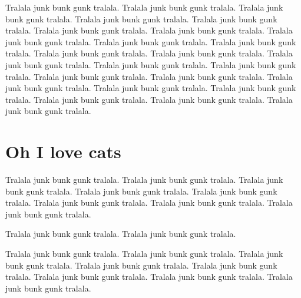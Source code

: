 \documentclass{book}
\begin{document}
Tralala junk bunk gunk tralala. Tralala junk bunk gunk tralala. Tralala junk bunk gunk tralala. Tralala junk bunk gunk tralala. Tralala junk bunk gunk tralala. Tralala junk bunk gunk tralala. Tralala junk bunk gunk tralala. Tralala junk bunk gunk tralala. Tralala junk bunk gunk tralala. Tralala junk bunk gunk tralala. Tralala junk bunk gunk tralala. Tralala junk bunk gunk tralala. Tralala junk bunk gunk tralala. Tralala junk bunk gunk tralala. Tralala junk bunk gunk tralala. Tralala junk bunk gunk tralala. Tralala junk bunk gunk tralala. Tralala junk bunk gunk tralala. Tralala junk bunk gunk tralala. Tralala junk bunk gunk tralala. Tralala junk bunk gunk tralala. Tralala junk bunk gunk tralala. Tralala junk bunk gunk tralala. 


\chapter{Oh I love cats}

Tralala junk bunk gunk tralala. Tralala junk bunk gunk tralala. Tralala junk bunk gunk tralala. Tralala junk bunk gunk tralala. Tralala junk bunk gunk tralala. Tralala junk bunk gunk tralala. Tralala junk bunk gunk tralala. Tralala junk bunk gunk tralala. 

Tralala junk bunk gunk tralala. Tralala junk bunk gunk tralala. 

Tralala junk bunk gunk tralala. Tralala junk bunk gunk tralala. Tralala junk bunk gunk tralala. Tralala junk bunk gunk tralala. Tralala junk bunk gunk tralala. Tralala junk bunk gunk tralala. Tralala junk bunk gunk tralala. Tralala junk bunk gunk tralala. 
\end{document}
